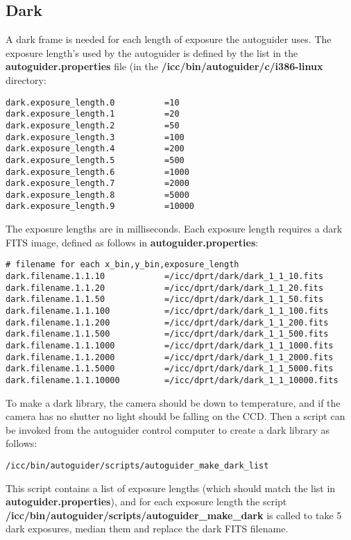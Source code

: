 \documentclass[10pt,a4paper]{article}
\begin{document}
\subsection{Dark}

A dark frame is needed for each length of exposure the autoguider uses. The exposure length's used by the autoguider
is defined by the list in the {\bf autoguider.properties} file (in the {\bf /icc/bin/autoguider/c/i386-linux} directory:

\begin{verbatim}
dark.exposure_length.0			=10
dark.exposure_length.1			=20
dark.exposure_length.2			=50
dark.exposure_length.3			=100
dark.exposure_length.4			=200
dark.exposure_length.5			=500
dark.exposure_length.6			=1000
dark.exposure_length.7			=2000
dark.exposure_length.8			=5000
dark.exposure_length.9			=10000
\end{verbatim}

The exposure lengths are in milliseconds. Each exposure length requires a dark FITS image, defined as follows in 
{\bf autoguider.properties}:

\begin{verbatim}
# filename for each x_bin,y_bin,exposure_length
dark.filename.1.1.10			=/icc/dprt/dark/dark_1_1_10.fits
dark.filename.1.1.20			=/icc/dprt/dark/dark_1_1_20.fits
dark.filename.1.1.50			=/icc/dprt/dark/dark_1_1_50.fits
dark.filename.1.1.100			=/icc/dprt/dark/dark_1_1_100.fits
dark.filename.1.1.200			=/icc/dprt/dark/dark_1_1_200.fits
dark.filename.1.1.500			=/icc/dprt/dark/dark_1_1_500.fits
dark.filename.1.1.1000			=/icc/dprt/dark/dark_1_1_1000.fits
dark.filename.1.1.2000			=/icc/dprt/dark/dark_1_1_2000.fits
dark.filename.1.1.5000			=/icc/dprt/dark/dark_1_1_5000.fits
dark.filename.1.1.10000			=/icc/dprt/dark/dark_1_1_10000.fits
\end{verbatim}

To make a dark library, the camera should be down to temperature, and if the camera has no shutter no light should be falling on the CCD. Then a script can be invoked from the autoguider control computer to create a dark library as follows:
\begin{verbatim}
/icc/bin/autoguider/scripts/autoguider_make_dark_list
\end{verbatim}

This script contains a list of exposure lengths (which should match the list in {\bf autoguider.properties}), and for each exposure length the script {\bf /icc/bin/autoguider/scripts/autoguider\_make\_dark} is called to take 5 dark exposures, median them and replace the dark FITS filename.
\end{document}
